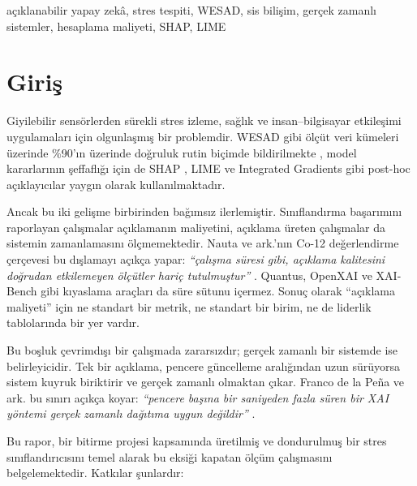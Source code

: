 \documentclass[conference]{IEEEtran}
\begin{document}
\begin{IEEEkeywords}
açıklanabilir yapay zekâ, stres tespiti, WESAD, sis bilişim, gerçek zamanlı
sistemler, hesaplama maliyeti, SHAP, LIME
\end{IEEEkeywords}

\section{Giriş}

Giyilebilir sensörlerden sürekli stres izleme, sağlık ve insan--bilgisayar
etkileşimi uygulamaları için olgunlaşmış bir problemdir. WESAD \cite{schmidt2018}
gibi ölçüt veri kümeleri üzerinde \%90'ın üzerinde doğruluk rutin biçimde
bildirilmekte \cite{kasnesis2025}, model kararlarının şeffaflığı için de SHAP
\cite{lundberg2017}, LIME \cite{ribeiro2016} ve Integrated Gradients
\cite{sundararajan2017} gibi post-hoc açıklayıcılar yaygın olarak
kullanılmaktadır.

Ancak bu iki gelişme birbirinden bağımsız ilerlemiştir. Sınıflandırma başarımını
raporlayan çalışmalar açıklamanın maliyetini, açıklama üreten çalışmalar da
sistemin zamanlamasını ölçmemektedir. Nauta ve ark.'nın Co-12 değerlendirme
çerçevesi bu dışlamayı açıkça yapar: \emph{``çalışma süresi gibi, açıklama
kalitesini doğrudan etkilemeyen ölçütler hariç tutulmuştur''} \cite{nauta2023}.
Quantus, OpenXAI ve XAI-Bench gibi kıyaslama araçları da süre sütunu içermez.
Sonuç olarak ``açıklama maliyeti'' için ne standart bir metrik, ne standart bir
birim, ne de liderlik tablolarında bir yer vardır.

Bu boşluk çevrimdışı bir çalışmada zararsızdır; gerçek zamanlı bir sistemde ise
belirleyicidir. Tek bir açıklama, pencere güncelleme aralığından uzun sürüyorsa
sistem kuyruk biriktirir ve gerçek zamanlı olmaktan çıkar. Franco de la Peña ve
ark. bu sınırı açıkça koyar: \emph{``pencere başına bir saniyeden fazla süren bir
XAI yöntemi gerçek zamanlı dağıtıma uygun değildir''} \cite{shats2025}.

Bu rapor, bir bitirme projesi kapsamında üretilmiş ve dondurulmuş bir stres
sınıflandırıcısını temel alarak bu eksiği kapatan ölçüm çalışmasını
belgelemektedir. Katkılar şunlardır:
\end{document}
